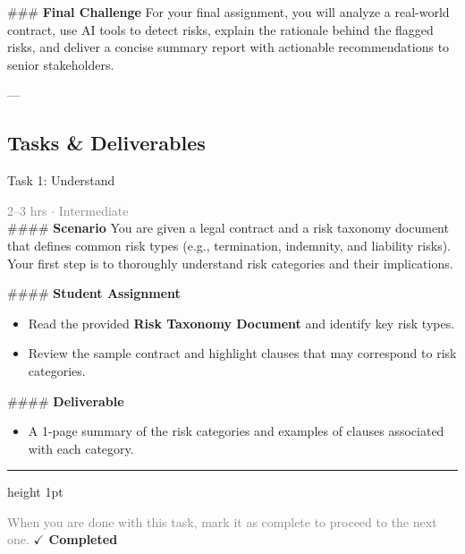 \documentclass[10pt,a4paper]{article}
\begin{document}
\#\#\# \textbf{Final Challenge}  
For your final assignment, you will analyze a real-world contract, use AI tools to detect risks, explain the rationale behind the flagged risks, and deliver a concise summary report with actionable recommendations to senior stakeholders.

---

\subsection*{Tasks \& Deliverables}

\begin{taskbox}{Task 1: Understand}

    {\small \textcolor{gray}{2--3 hrs $\cdot$ Intermediate}}\\[12pt]

    \#\#\#\# \textbf{Scenario}  
You are given a legal contract and a risk taxonomy document that defines common risk types (e.g., termination, indemnity, and liability risks). Your first step is to thoroughly understand risk categories and their implications.  

\#\#\#\# \textbf{Student Assignment}  
\begin{itemize}
    \item Read the provided \textbf{Risk Taxonomy Document} and identify key risk types.  
    \item Review the sample contract and highlight clauses that may correspond to risk categories.  
\end{itemize}

\#\#\#\# \textbf{Deliverable}  
\begin{itemize}
    \item A 1-page summary of the risk categories and examples of clauses associated with each category.\par
\end{itemize}

    \vspace{16pt}

    \textcolor{cardBorder}{\hrule height 1pt}\vspace{8pt}

    \small \textcolor{gray}{When you are done with this task, mark it as complete to proceed to the next one.} \hfill \textbf{\textcolor{brandDark}{$\checkmark$ Completed}}

\end{taskbox}
\end{document}
